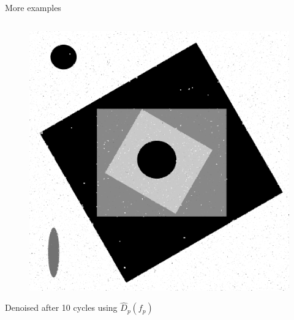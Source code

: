 \documentclass[mathserif]{beamer}
\begin{document}



\begin{frame}{More examples}
    \begin{columns}
        \begin{column}{.3\textwidth}
            \begin{figure}
                \centering
                \includegraphics[width=\textwidth]{../testimages/shapes/shapes_500_15percent/denoised_shapes_500_15percent_10_cycle.png}
            \end{figure}
                \centering
                Denoised after 10 cycles using $\hat D_p(f_p)$ \phantom{hahahahha$V(f_q,f_p) ll lsadasdsad asd sa d$} \phantom{hahahhahahahahhahahahaha sadasdasdasasdaasasdasdasdasdsadsdh $V_p$} 


\end{column}
\end{columns}
\end{frame}
\end{document}
